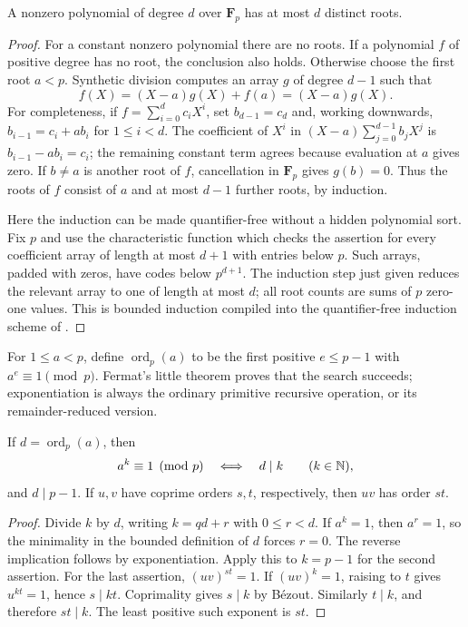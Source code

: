 \begin{theorem}\label{qr:roots}
A nonzero polynomial of degree $d$ over $\mathbf F_p$ has at most $d$
distinct roots.
\end{theorem}
\begin{proof}
For a constant nonzero polynomial there are no roots.  If a polynomial $f$
of positive degree has no root, the conclusion also holds.  Otherwise choose
the first root $a<p$.  Synthetic division computes an array $g$ of degree
$d-1$ such that
\[
 f(X)=(X-a)g(X)+f(a)=(X-a)g(X).
\]
For completeness, if $f=\sum_{i=0}^d c_iX^i$, set $b_{d-1}=c_d$ and,
working downwards, $b_{i-1}=c_i+ab_i$ for $1\le i<d$.  The coefficient
of $X^i$ in $(X-a)\sum_{j=0}^{d-1}b_jX^j$ is $b_{i-1}-ab_i=c_i$;
the remaining constant term agrees because evaluation at $a$ gives zero.
If $b\ne a$ is another root of $f$, cancellation in $\mathbf F_p$ gives
$g(b)=0$.  Thus the roots of $f$ consist of $a$ and at most $d-1$ further
roots, by induction.

Here the induction can be made quantifier-free without a hidden polynomial
sort. Fix $p$ and use the characteristic function which checks the assertion
for every coefficient array of length at most $d+1$ with entries below $p$.
Such arrays, padded with zeros, have codes below $p^{d+1}$.  The induction
step just given reduces the relevant array to one of length at most $d$;
all root counts are sums of $p$ zero-one values.  This is bounded induction
compiled into the quantifier-free induction scheme of \ipra.
\end{proof}

For $1\le a<p$, define $\operatorname{ord}_p(a)$ to be the first positive
$e\le p-1$ with $a^e\equiv1\pmod p$. Fermat's little theorem proves that
the search succeeds; exponentiation is always the ordinary primitive
recursive operation, or its remainder-reduced version.

\begin{lemma}\label{qr:orders}
If $d=\operatorname{ord}_p(a)$, then
\[
 a^k\equiv1\pmod p\quad\Longleftrightarrow\quad d\mid k
 \qquad(k\in\mathbb N),
\]
and $d\mid p-1$.  If $u,v$ have coprime orders $s,t$, respectively,
then $uv$ has order $st$.
\end{lemma}
\begin{proof}
Divide $k$ by $d$, writing $k=qd+r$ with $0\le r<d$.  If $a^k=1$,
then $a^r=1$, so the minimality in the bounded definition of $d$ forces
$r=0$.  The reverse implication follows by exponentiation. Apply this to
$k=p-1$ for the second assertion.  For the last assertion, $(uv)^{st}=1$.
If $(uv)^k=1$, raising to $t$ gives $u^{kt}=1$, hence $s\mid kt$.
Coprimality gives $s\mid k$ by B\'ezout. Similarly $t\mid k$, and therefore
$st\mid k$. The least positive such exponent is $st$.
\end{proof}

